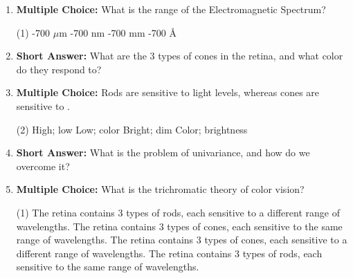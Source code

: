 \begin{enumerate}[label=\textbf{Q2.9.\arabic*}]
      \item \textbf{Multiple Choice:} What is the range of the Electromagnetic Spectrum?
            \begin{tasks}[label=(\Alph*), label-width=1.5em, item-indent=1.7em](1)
                  -700 \(\mu\)m
                  -700 nm
                  -700 mm
                  -700 \AA
            \end{tasks}

      \item \textbf{Short Answer:} What are the 3 types of cones in the retina, and what color do they respond to? \\

      \item \textbf{Multiple Choice:} Rods are sensitive to \underline{\hspace{3cm}} light levels, whereas cones are sensitive to \underline{\hspace{3cm}}. 
            \begin{tasks}[label=(\Alph*), label-width=1.5em, item-indent=1.7em](2)
                  \task High; low
                  \task Low; color
                  \task Bright; dim
                  \task Color; brightness
            \end{tasks}

      \item \textbf{Short Answer:} What is the problem of univariance, and how do we overcome it? \\

      \item \textbf{Multiple Choice:} What is the trichromatic theory of color vision?
            \begin{tasks}[label=(\Alph*), label-width=1.5em, item-indent=1.7em](1)
                  \task The retina contains 3 types of rods, each sensitive to a different range of wavelengths.
                  \task The retina contains 3 types of cones, each sensitive to the same range of wavelengths.
                  \task The retina contains 3 types of cones, each sensitive to a different range of wavelengths.
                  \task The retina contains 3 types of rods, each sensitive to the same range of wavelengths.
            \end{tasks}


\end{enumerate}
